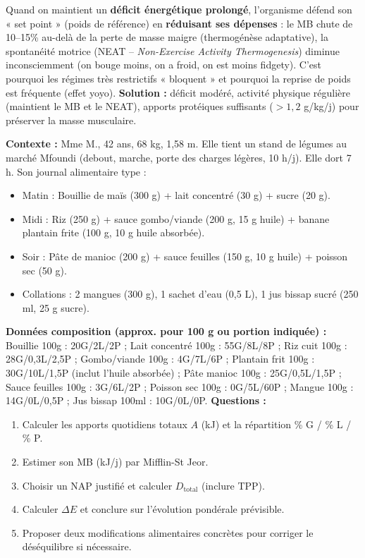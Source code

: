\documentclass[11pt]{article}
\begin{document}
\begin{savaistu}
Quand on maintient un \textbf{déficit énergétique prolongé}, l'organisme défend son « set point » (poids de référence) en \textbf{réduisant ses dépenses} : le MB chute de 10--15\% au-delà de la perte de masse maigre (thermogénèse adaptative), la spontanéité motrice (NEAT -- \emph{Non-Exercise Activity Thermogenesis}) diminue inconsciemment (on bouge moins, on a froid, on est moins fidgety). C'est pourquoi les régimes très restrictifs « bloquent » et pourquoi la reprise de poids est fréquente (effet yoyo). \textbf{Solution :} déficit modéré, activité physique régulière (maintient le MB et le NEAT), apports protéiques suffisants ($> 1,2$ g/kg/j) pour préserver la masse musculaire.
\end{savaistu}

\begin{exercice}
\textbf{Contexte :} Mme M., 42 ans, 68 kg, 1,58 m. Elle tient un stand de légumes au marché Mfoundi (debout, marche, porte des charges légères, 10 h/j). Elle dort 7 h. Son journal alimentaire type :
\begin{itemize}
    \item Matin : Bouillie de maïs (300 g) + lait concentré (30 g) + sucre (20 g).
    \item Midi : Riz (250 g) + sauce gombo/viande (200 g, 15 g huile) + banane plantain frite (100 g, 10 g huile absorbée).
    \item Soir : Pâte de manioc (200 g) + sauce feuilles (150 g, 10 g huile) + poisson sec (50 g).
    \item Collations : 2 mangues (300 g), 1 sachet d'eau (0,5 L), 1 jus bissap sucré (250 ml, 25 g sucre).
\end{itemize}
\textbf{Données composition (approx. pour 100 g ou portion indiquée) :} Bouillie 100g : 20G/2L/2P ; Lait concentré 100g : 55G/8L/8P ; Riz cuit 100g : 28G/0,3L/2,5P ; Gombo/viande 100g : 4G/7L/6P ; Plantain frit 100g : 30G/10L/1,5P (inclut l'huile absorbée) ; Pâte manioc 100g : 25G/0,5L/1,5P ; Sauce feuilles 100g : 3G/6L/2P ; Poisson sec 100g : 0G/5L/60P ; Mangue 100g : 14G/0L/0,5P ; Jus bissap 100ml : 10G/0L/0P.
\textbf{Questions :}
\begin{enumerate}
    \item Calculer les apports quotidiens totaux $A$ (kJ) et la répartition \% G / \% L / \% P.
    \item Estimer son MB (kJ/j) par Mifflin-St Jeor.
    \item Choisir un NAP justifié et calculer $D_{\text{total}}$ (inclure TPP).
    \item Calculer $\Delta E$ et conclure sur l'évolution pondérale prévisible.
    \item Proposer deux modifications alimentaires concrètes pour corriger le déséquilibre si nécessaire.
\end{enumerate}
\end{exercice}
\end{document}
